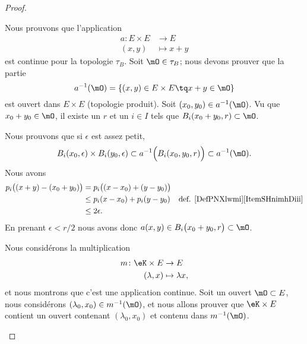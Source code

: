 \begin{proof}
\begin{subproof}
		Nous prouvons que l'application
		\begin{equation}
			\begin{aligned}
				a\colon E\times E & \to E       \\
				(x,y)             & \mapsto x+y
			\end{aligned}
		\end{equation}
		est continue pour la topologie \( \tau_B\). Soit \( \mO\in \tau_B\); nous devons prouver que la partie
		\begin{equation}
			a^{-1}(\mO)=\{ (x,y)\in E\times E\tq x+y\in \mO \}
		\end{equation}
		est ouvert dans \( E\times E\) (topologie produit). Soit \( (x_0,y_0)\in a^{-1}(\mO)\). Vu que \( x_0+y_0\in\mO\), il existe un \( r\) et un \( i\in I\) tels que \( B_i(x_0+y_0,r)\subset\mO\).

		Nous prouvons que si \( \epsilon\) est assez petit,
		\begin{equation}
			B_i(x_0,\epsilon)\times B_i(y_0,\epsilon)\subset a^{-1}\Big( B_i(x_0,y_0,r) \Big)\subset a^{-1}(\mO).
		\end{equation}
		Nous avons
		\begin{subequations}
			\begin{align}
				p_i\big( (x+y)-(x_0+y_0) \big) & = p_i\big( (x-x_0)+(y-y_0) \big)                                                    \\
				                               & \leq p_i(x-x_0)+p_i(y-y_0)       & \text{def. \ref{DefPNXlwmi}\ref{ItemSHnimhDiii}} \\
				                               & \leq 2\epsilon.
			\end{align}
		\end{subequations}
		En prenant \( \epsilon<r/2\) nous avons donc \( a(x,y)\in B_i\big( x_0+y_0,r \big)\subset \mO\).

		Nous considérons la multiplication
		\begin{equation}
			\begin{aligned}
				m\colon \eK\times E & \to E              \\
				(\lambda,x)         & \mapsto \lambda x,
			\end{aligned}
		\end{equation}
		et nous montrons que c'est une application continue. Soit un ouvert \( \mO\subset E\), nous considérons \( (\lambda_0,x_0)\in m^{-1}(\mO)\), et nous allons prouver que \( \eK\times E\) contient un ouvert contenant \( (\lambda_0,x_0)\) et contenu dans \( m^{-1}(\mO)\).


\end{subproof}
\end{proof}
